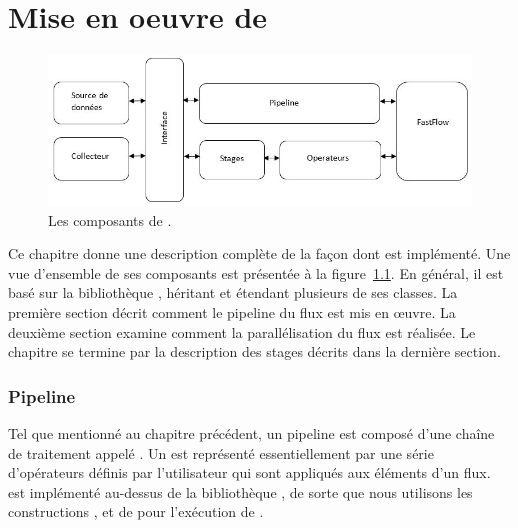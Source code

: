 
\chapter{Mise en oeuvre de \PpFf}
\label{implementation.chap}




\begin{figure}[ht]
\centering
     \includegraphics[width=1.0\textwidth]{Figures/AllComponentsAPI.jpg}
      \caption{Les composants de .}
       \label{AllComponentsAPI.fig}
\end{figure}


Ce chapitre donne une description compl\`ete de la fa\c{c}on dont  est impl\'ement\'e. Une vue d'ensemble de ses composants est pr\'esent\'ee à la figure~\ref{AllComponentsAPI.fig}. En g\'en\'eral, il est bas\'e sur la biblioth\`eque , h\'eritant et \'etendant plusieurs de ses classes.
La premi\`ere section d\'ecrit  comment le pipeline du flux est mis en œuvre. La deuxi\`eme section examine  comment la parall\'elisation du flux est r\'ealis\'ee. Le chapitre se termine par la description des stages d\'ecrits dans la derni\`ere section.


\subsection{Pipeline}

Tel que mentionn\'e au chapitre pr\'ec\'edent, un pipeline est compos\'e d'une cha\^ine de traitement appel\'e . Un  est repr\'esent\'e essentiellement par une s\'erie d'op\'erateurs d\'efinis par l'utilisateur qui sont appliqu\'es aux \'el\'ements d'un flux.  est impl\'ement\'e au-dessus de la biblioth\`eque , de sorte que nous utilisons les constructions ,  et  de  pour l'ex\'ecution de . 


